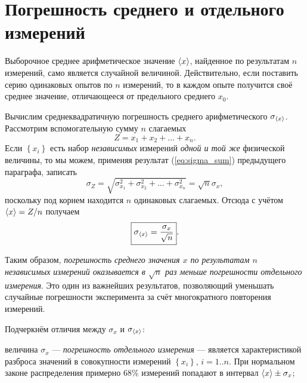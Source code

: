 
\section{Погрешность среднего и отдельного измерений\label{sec:average}}

Выборочное среднее арифметическое значение $\left<x\right>$, найденное
по результатам $n$ измерений, само является случайной величиной.
Действительно, если поставить серию одинаковых опытов по $n$ измерений,
то в каждом опыте получится своё среднее значение, отличающееся от
предельного среднего $x_{0}$.

Вычислим среднеквадратичную погрешность среднего арифметического $\sigma_{\left<x\right>}$.
Рассмотрим вспомогательную сумму $n$ слагаемых 
\[
Z=x_{1}+x_{2}+\ldots+x_{n}.
\]
Если $\left\{ x_{i}\right\} $ есть набор \emph{независимых} измерений
\emph{одной и той же} физической величины, то мы можем, применяя результат
(\ref{eq:sigma_sum}) предыдущего параграфа, записать
\[
\sigma_{Z}=\sqrt{\sigma_{x_{1}}^{2}+\sigma_{x_{2}}^{2}+\ldots+\sigma_{x_{n}}^{2}}=\sqrt{n}\sigma_{x},
\]
поскольку под корнем находится $n$ одинаковых слагаемых. Отсюда с
учётом $\left<x\right>=Z/n$ получаем
\begin{equation}
\boxed{{\sigma_{\left<x\right>}=\frac{\sigma_{x}}{\sqrt{n}}}}.\label{eq:sigma_avg}
\end{equation}

Таким образом, \emph{погрешность среднего значения $x$ по результатам
$n$ независимых измерений оказывается в $\sqrt{n}$ раз меньше погрешности
отдельного измерения}. Это один из важнейших результатов, позволяющий
уменьшать случайные погрешности эксперимента за счёт многократного
повторения измерений.

Подчеркнём отличия между $\sigma_{x}$ и $\sigma_{\left<x\right>}$:

величина $\sigma_{x}$ --- \emph{погрешность отдельного
измерения} --- является характеристикой разброса значений
в совокупности измерений $\left\{ x_{i}\right\} $, $i=1..n$. При
нормальном законе распределения примерно 68\% измерений попадают в
интервал $\left<x\right>\pm\sigma_{x}$;

